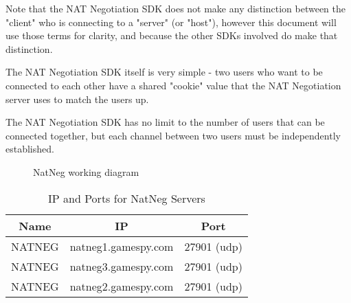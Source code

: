 \documentclass[oneside,titlepage,a4paper]{Definition/retrospy} %
\begin{document}
Note that the NAT Negotiation SDK does not make any distinction between the "client" who is connecting to a "server" (or "host"), however this document will use those terms for clarity, and because the other SDKs involved do make that distinction.

The NAT Negotiation SDK itself is very simple - two users who want to be connected to each other have a shared "cookie" value that the NAT Negotiation server uses to match the users up. 

The NAT Negotiation SDK has no limit to the number of users that can be connected together, but each channel between two users must be independently established.



\begin{figure}[H]
	\centering
\caption{NatNeg working diagram}
\label{NatNeg working diagram}
\end{figure}


\begin{table}[H]
	\centering
	\begin{tabular}{|c|c|c|}
		\hline 
		\textbf{Name}&\textbf{IP}&\textbf{Port}\\ 
		\hline 
		NATNEG&natneg1.gamespy.com&27901 (udp) \\ 
		\hline
				NATNEG&natneg3.gamespy.com&27901 (udp) \\ 
		\hline 
				NATNEG&natneg2.gamespy.com&27901 (udp) \\ 
		\hline 
	\end{tabular} 
	\caption{IP and Ports for NatNeg Servers}
	\label{IP and Ports for NatNeg Servers}
	
\end{table}
\end{document}
